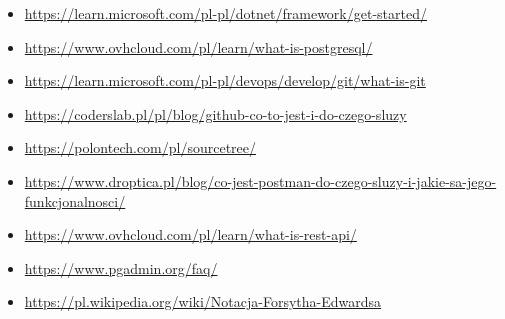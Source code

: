 \documentclass[12pt,a4paper]{article}
\begin{document}
\begin{itemize}
    \item \href{https://learn.microsoft.com/pl-pl/dotnet/framework/get-started/}{https://learn.microsoft.com/pl-pl/dotnet/framework/get-started/}
    \item \href{https://www.ovhcloud.com/pl/learn/what-is-postgresql/}{https://www.ovhcloud.com/pl/learn/what-is-postgresql/}
    \item \href{https://learn.microsoft.com/pl-pl/devops/develop/git/what-is-git}{https://learn.microsoft.com/pl-pl/devops/develop/git/what-is-git}
    \item \href{https://coderslab.pl/pl/blog/github-co-to-jest-i-do-czego-sluzy}{https://coderslab.pl/pl/blog/github-co-to-jest-i-do-czego-sluzy}
    \item \href{https://polontech.com/pl/sourcetree/}{https://polontech.com/pl/sourcetree/}
    \item \href{https://www.droptica.pl/blog/co-jest-postman-do-czego-sluzy-i-jakie-sa-jego-funkcjonalnosci/}{https://www.droptica.pl/blog/co-jest-postman-do-czego-sluzy-i-jakie-sa-jego-funkcjonalnosci/}
    \item \href{https://www.ovhcloud.com/pl/learn/what-is-rest-api/}{https://www.ovhcloud.com/pl/learn/what-is-rest-api/}
    \item \href{https://www.pgadmin.org/faq/}{https://www.pgadmin.org/faq/}
    \item \href{https://pl.wikipedia.org/wiki/Notacja-Forsytha-Edwardsa}{https://pl.wikipedia.org/wiki/Notacja-Forsytha-Edwardsa}
\end{itemize}
\end{document}
